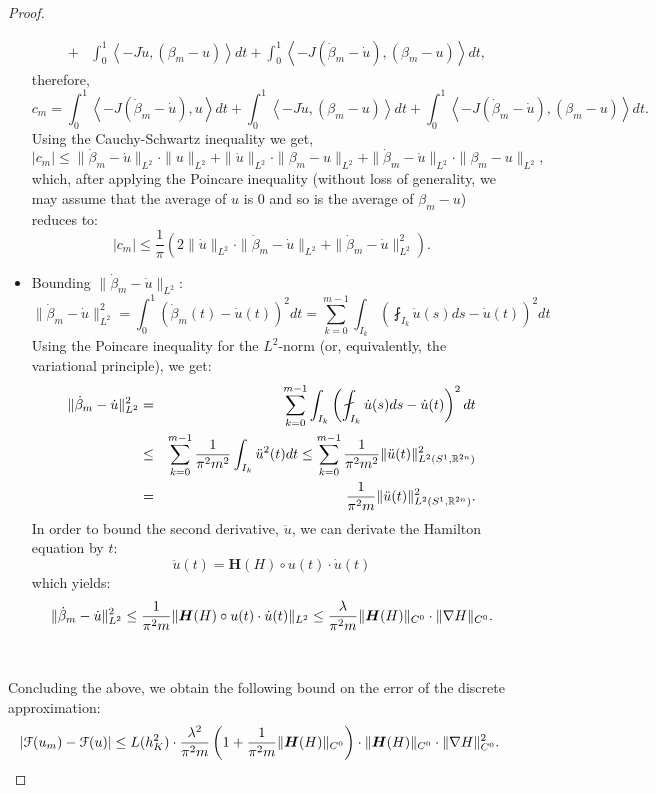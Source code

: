 \documentclass[../capacities_main.tex]{subfiles}
\begin{document}
\begin{proof}
\begin{itemize}
\begin{eqnarray*}
			&+& \int_0^1 \left<-J\dot u,(\beta_m-u)\right>dt + \int_0^1 \left<-J(\dot\beta_m-\dot u),(\beta_m-u)\right>dt,
		\end{eqnarray*}
		therefore,
		\[
		c_m = \int_0^1 \left<-J(\dot\beta_m-\dot u),u\right>dt + \int_0^1 \left<-J\dot u,(\beta_m-u)\right>dt + \int_0^1 \left<-J(\dot\beta_m-\dot u),(\beta_m-u)\right>dt.
		\]
		Using the Cauchy-Schwartz inequality we get,
		\[
		|c_m| \leq \|\dot\beta_m-\dot u\|_{L^2} \cdot \|u\|_{L^2} + \|\dot u\|_{L^2}\cdot \|\beta_m-u\|_{L^2} + \|\dot\beta_m-\dot u\|_{L^2}\cdot \|\beta_m-u\|_{L^2},
		\]
		which, after applying the Poincare inequality (without loss of generality, we may assume that the average of $u$ is 0 and so is the average of $\beta_m-u$) reduces to:
		\[
		|c_m| \leq \frac{1}{\pi} \left(2 \|\dot u\|_{L^2}\cdot \|\dot\beta_m-\dot u\|_{L^2} + \|\dot\beta_m-\dot u\|_{L^2}^2\right).
		\]
		\item 	Bounding $\|\dot\beta_m-\dot u\|_{L^2}$:
		\[
		\|\dot\beta_m-\dot u\|_{L^2}^2 = \int_0^1 (\dot\beta_m(t)-\dot u(t))^2 dt = \sum_{k=0}^{m-1} \int_{I_k} \left( \fint_{I_k}\dot u(s) ds-\dot u(t)\right)^2 dt
		\]
		Using the Poincare inequality for the $L^2$-norm (or, equivalently, the variational principle), we get:
		\begin{eqnarray*}
			\|\dot\beta_m-\dot u\|_{L^2}^2 &=& \sum_{k=0}^{m-1} \int_{I_k} \left( \fint_{I_k}\dot u(s) ds-\dot u(t)\right)^2 dt\\
			&\leq& \sum_{k=0}^{m-1} \frac{1}{\pi^2 m^2}\int_{I_k} \ddot u^2(t)dt \leq  \sum_{k=0}^{m-1} \frac{1}{\pi^2 m^2} \|\ddot u(t)\|_{L^2(S^1,\R^{2n})}^2\\
			&=& \frac{1}{\pi^2 m} \|\ddot u(t)\|_{L^2(S^1,\R^{2n})}^2.
		\end{eqnarray*}
		In order to bound the second derivative, $\ddot u$, we can derivate the Hamilton equation by $t$:
		\[
		\ddot u(t) = \boldsymbol{H} (H)\circ u(t)\cdot \dot u(t)
		\]
		which yields:
		\[
		\|\dot\beta_m-\dot u\|_{L^2}^2 \leq \frac{1}{\pi^2 m} \|\boldsymbol{H}(H)\circ u(t)\cdot \dot u(t)\|_{L^2}\leq \frac{\lambda}{\pi^2 m}\|\boldsymbol{H} (H)\|_{C^0}\cdot \|\nabla H\|_{C^0}.
		\]
	\end{itemize}\
	
	Concluding the above, we obtain the following bound on the error of the discrete approximation:
	\[
	|{\mathcal F}(u_m)-{\mathcal F}(u)|\leq  L(h_K^2) \cdot\frac{\lambda^2}{\pi^2 m} \left(1+\frac{1}{\pi^2 m}\|\boldsymbol{H} (H)\|_{C^0}\right) \cdot\|\boldsymbol{H} (H)\|_{C^0}\cdot \|\nabla H\|_{C^0}^2.
	\]
\end{proof}\
\end{document}
